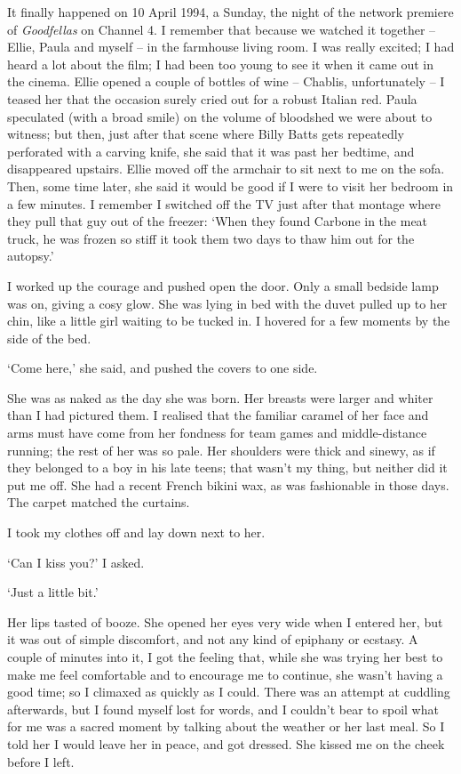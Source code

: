 It finally happened on 10 April 1994, a Sunday, the night of the network premiere of \textit{Goodfellas} on Channel 4. I remember that because we watched it together -- Ellie, Paula and myself -- in the farmhouse living room. I was really excited; I had heard a lot about the film; I had been too young to see it when it came out in the cinema. Ellie opened a couple of bottles of wine -- Chablis, unfortunately -- I teased her that the occasion surely cried out for a robust Italian red. Paula speculated (with a broad smile) on the volume of bloodshed we were about to witness; but then, just after that scene where Billy Batts gets repeatedly perforated with a carving knife, she said that it was past her bedtime, and disappeared upstairs. Ellie moved off the armchair to sit next to me on the sofa. Then, some time later, she said it would be good if I were to visit her bedroom in a few minutes. I remember I switched off the TV just after that montage where they pull that guy out of the freezer: `When they found Carbone in the meat truck, he was frozen so stiff it took them two days to thaw him out for the autopsy.'

I worked up the courage and pushed open the door. Only a small bedside lamp was on, giving a cosy glow. She was lying in bed with the duvet pulled up to her chin, like a little girl waiting to be tucked in. I hovered for a few moments by the side of the bed.

`Come here,' she said, and pushed the covers to one side.

She was as naked as the day she was born. Her breasts were larger and whiter than I had pictured them. I realised that the familiar caramel of her face and arms must have come from her fondness for team games and middle-distance running; the rest of her was so pale. Her shoulders were thick and sinewy, as if they belonged to a boy in his late teens; that wasn't my thing, but neither did it put me off. She had a recent French bikini wax, as was fashionable in those days. The carpet matched the curtains.

I took my clothes off and lay down next to her.

`Can I kiss you?' I asked.

`Just a little bit.'

Her lips tasted of booze. She opened her eyes very wide when I entered her, but it was out of simple discomfort, and not any kind of epiphany or ecstasy. A couple of minutes into it, I got the feeling that, while she was trying her best to make me feel comfortable and to encourage me to continue, she wasn't having a good time; so I climaxed as quickly as I could. There was an attempt at cuddling afterwards, but I found myself lost for words, and I couldn't bear to spoil what for me was a sacred moment by talking about the weather or her last meal. So I told her I would leave her in peace, and got dressed. She kissed me on the cheek before I left.

